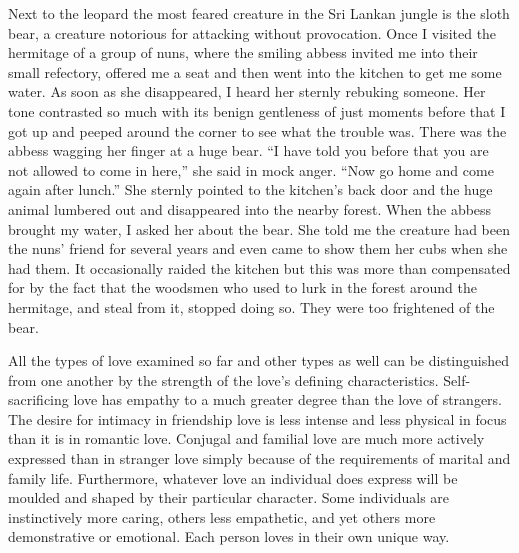 \documentclass[10pt, openright]{book}
\begin{document}
Next to the leopard the most feared creature in the Sri Lankan jungle is the sloth bear, a creature notorious for attacking without provocation. Once I visited the hermitage of a group of nuns, where the smiling abbess invited me into their small refectory, offered me a seat and then went into the kitchen to get me some water. As soon as she disappeared, I heard her sternly rebuking someone. Her tone contrasted so much with its benign gentleness of just moments before that I got up and peeped around the corner to see what the trouble was. There was the abbess wagging her finger at a huge bear. “I have told you before that you are not allowed to come in here,” she said in mock anger. “Now go home and come again after lunch.” She sternly pointed to the kitchen’s back door and the huge animal lumbered out and disappeared into the nearby forest. When the abbess brought my water, I asked her about the bear. She told me the creature had been the nuns’ friend for several years and even came to show them her cubs when she had them. It occasionally raided the kitchen but this was more than compensated for by the fact that the woodsmen who used to lurk in the forest around the hermitage, and steal from it, stopped doing so. They were too frightened of the bear.


All the types of love examined so far and other types as well can be distinguished from one another by the strength of the love’s defining characteristics. Self-sacrificing love has empathy to a much greater degree than the love of strangers. The desire for intimacy in friendship love is less intense and less physical in focus than it is in romantic love. Conjugal and familial love are much more actively expressed than in stranger love simply because of the requirements of marital and family life. Furthermore, whatever love an individual does express will be moulded and shaped by their particular character. Some individuals are instinctively more caring, others less empathetic, and yet others more demonstrative or emotional. Each person loves in their own unique way.
\end{document}
